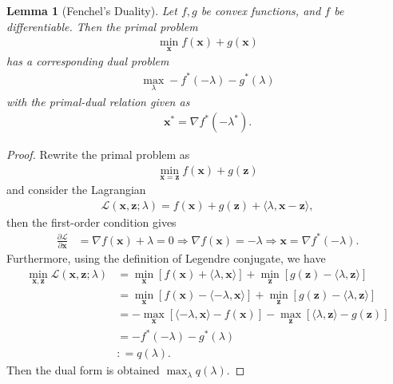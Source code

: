\documentclass[11pt]{book}
\newtheorem{lemma}[theorem]{Lemma}
\begin{document}
\begin{lemma}[Fenchel's Duality]
    Let $f, g$ be convex functions, and $f$ be differentiable. Then the primal problem
    \begin{align*}
        \min_\mathbf{x} f(\mathbf{x}) + g(\mathbf{x})
    \end{align*}
    has a corresponding dual problem
    \begin{align*}
        \max_{\lambda} -f^*(-\lambda) - g^*(\lambda)
    \end{align*}
    with the primal-dual relation given as 
    \begin{align*}
        \mathbf{x}^* = \nabla f^*(-\lambda^*).
    \end{align*}
\end{lemma}
\begin{proof}
    Rewrite the primal problem as
    \begin{align*}
        \min_{\mathbf{x}=\mathbf{z}} f(\mathbf{x})+g(\mathbf{z})
    \end{align*}
    and consider the Lagrangian
    \begin{align*}
        \mathcal{L}(\mathbf{x},\mathbf{z};\lambda) = f(\mathbf{x})+g(\mathbf{z}) + \langle \lambda, \mathbf{x}-\mathbf{z} \rangle,
    \end{align*}
    then the first-order condition gives
    \begin{align*}
        \frac{\partial \mathcal{L}}{\partial \mathbf{x}} &= \nabla f(\mathbf{x}) + \lambda = 0 \Rightarrow \nabla f(\mathbf{x}) = -\lambda\Rightarrow \mathbf{x} = \nabla f^*(-\lambda).
    \end{align*}
    Furthermore, using the definition of Legendre conjugate, we have
    \begin{align*}
        \min_{\mathbf{x}, \mathbf{z}} \mathcal{L}(\mathbf{x}, \mathbf{z}; \lambda) & = \min_{\mathbf{x}} \left[ f(\mathbf{x}) + \langle \lambda, \mathbf{x} \rangle \right] + \min_{\mathbf{z}} \left[ g(\mathbf{z}) - \langle \lambda, \mathbf{z} \rangle \right] \\
        &= \min_{\mathbf{x}} \left[ f(\mathbf{x}) - \langle -\lambda, \mathbf{x} \rangle \right] + \min_{\mathbf{z}} \left[ g(\mathbf{z}) - \langle \lambda, \mathbf{z} \rangle \right] \\
        &= -\max_{\mathbf{x}} \left[ \langle -\lambda, \mathbf{x} \rangle - f(\mathbf{x}) \right] - \max_{\mathbf{z}} \left[ \langle \lambda, \mathbf{z} \rangle - g(\mathbf{z}) \right] \\
        &= - f^*(-\lambda) - g^*(\lambda) \\
        & : = q(\lambda).
    \end{align*}
    Then the dual form is obtained $\max_{\lambda} q(\lambda)$.
\end{proof}
\end{document}
